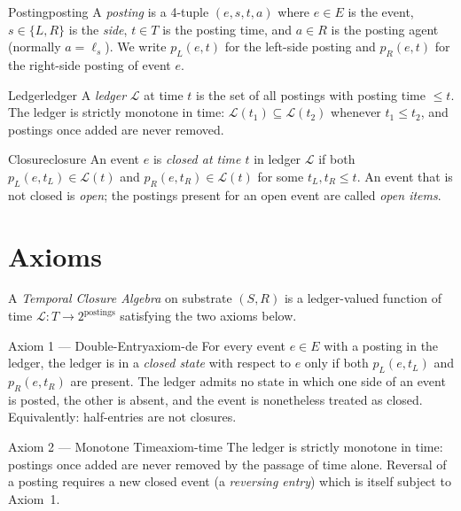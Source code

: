 \documentclass[11pt]{article}
\begin{document}
\begin{defnBOX}{Posting}{posting}
A \emph{posting} is a 4-tuple $(e, s, t, a)$ where $e \in E$ is the event, $s \in \{L, R\}$ is the \emph{side}, $t \in T$ is the posting time, and $a \in R$ is the posting agent (normally $a = \ell_s$). We write $p_L(e, t)$ for the left-side posting and $p_R(e, t)$ for the right-side posting of event $e$.
\end{defnBOX}

\begin{defnBOX}{Ledger}{ledger}
A \emph{ledger} $\mathcal{L}$ at time $t$ is the set of all postings with posting time $\leq t$. The ledger is strictly monotone in time: $\mathcal{L}(t_1) \subseteq \mathcal{L}(t_2)$ whenever $t_1 \leq t_2$, and postings once added are never removed.
\end{defnBOX}

\begin{defnBOX}{Closure}{closure}
An event $e$ is \emph{closed at time $t$} in ledger $\mathcal{L}$ if both $p_L(e, t_L) \in \mathcal{L}(t)$ and $p_R(e, t_R) \in \mathcal{L}(t)$ for some $t_L, t_R \leq t$. An event that is not closed is \emph{open}; the postings present for an open event are called \emph{open items}.
\end{defnBOX}

\section{Axioms}

A \emph{Temporal Closure Algebra} on substrate $(S, R)$ is a ledger-valued function of time $\mathcal{L}: T \to 2^{\text{postings}}$ satisfying the two axioms below.

\begin{axiomBOX}{Axiom 1 --- Double-Entry}{axiom-de}
For every event $e \in E$ with a posting in the ledger, the ledger is in a \emph{closed state} with respect to $e$ only if both $p_L(e, t_L)$ and $p_R(e, t_R)$ are present. The ledger admits no state in which one side of an event is posted, the other is absent, and the event is nonetheless treated as closed. Equivalently: half-entries are not closures.
\end{axiomBOX}

\begin{axiomBOX}{Axiom 2 --- Monotone Time}{axiom-time}
The ledger is strictly monotone in time: postings once added are never removed by the passage of time alone. Reversal of a posting requires a new closed event (a \emph{reversing entry}) which is itself subject to Axiom~1.
\end{axiomBOX}
\end{document}
